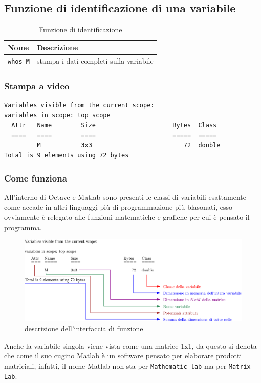 \subsection{Funzione di identificazione di una variabile}
\label{sec:funiden}
\begin{table}[ht]
  \centering
  \begin{tabular}[tab:funzionediid]{ll}
    {\bf Nome} & {\bf Descrizione} \\\hline
    \lstinline|whos M| & stampa i dati completi sulla variabile
  \end{tabular}
  \caption{Funzione di identificazione}
  \label{tab:funzionediid}
\end{table}
\subsubsection{Stampa a video}
\label{sec:stampiden}
\begin{small}
\begin{verbatim}
Variables visible from the current scope:
variables in scope: top scope
  Attr   Name        Size                     Bytes  Class
  ====   ====        ====                     =====  =====
         M           3x3                         72  double
Total is 9 elements using 72 bytes
\end{verbatim}
\end{small}
\clearpage

\subsubsection{Come funziona}
All'interno di Octave e Matlab sono presenti le classi di variabili
esattamente come accade in altri linguaggi più di programmazione più blasonati,
esso ovviamente è relegato alle funzioni matematiche e grafiche per cui è
pensato il programma.
\begin{figure}[ht]
  \centering
  \includegraphics[width=15cm]{img/finiti/whos.eps}
  \caption{descrizione dell'interfaccia di funzione}
  \label{fig:interffun}
\end{figure}
\begin{notab}
  Anche la variabile singola viene vista come una matrice 1x1, da questo si
  denota che come il suo cugino Matlab è un software pensato per elaborare
  prodotti matriciali, infatti, il nome Matlab non sta per \texttt{Mathematic
    lab} ma per \texttt{Matrix Lab}. 
\end{notab}
